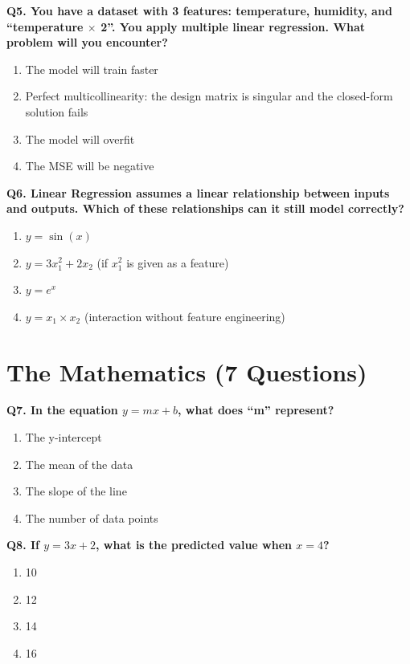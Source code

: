 \documentclass[12pt, a4paper]{article}
\newcommand{\question}[1]{\vspace{0.6em}\noindent\textbf{#1}}
\begin{document}
\question{Q5. You have a dataset with 3 features: temperature, humidity, and ``temperature $\times$ 2''. You apply multiple linear regression. What problem will you encounter?}
\begin{enumerate}[label=\alph*)]
    \item The model will train faster
    \item Perfect multicollinearity: the design matrix is singular and the closed-form solution fails
    \item The model will overfit
    \item The MSE will be negative
\end{enumerate}

\question{Q6. Linear Regression assumes a linear relationship between inputs and outputs. Which of these relationships can it still model correctly?}
\begin{enumerate}[label=\alph*)]
    \item $y = \sin(x)$
    \item $y = 3x_1^2 + 2x_2$ (if $x_1^2$ is given as a feature)
    \item $y = e^x$
    \item $y = x_1 \times x_2$ (interaction without feature engineering)
\end{enumerate}

\section{The Mathematics (7 Questions)}

\question{Q7. In the equation $y = mx + b$, what does ``m'' represent?}
\begin{enumerate}[label=\alph*)]
    \item The y-intercept
    \item The mean of the data
    \item The slope of the line
    \item The number of data points
\end{enumerate}

\question{Q8. If $y = 3x + 2$, what is the predicted value when $x = 4$?}
\begin{enumerate}[label=\alph*)]
    \item 10
    \item 12
    \item 14
    \item 16
\end{enumerate}
\end{document}
